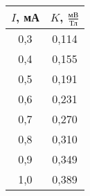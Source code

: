 \begin{tabular}{cc}
\toprule
$I$, мА & $K$, $\frac{\text{мВ}}{\text{Тл}}$ \\
\midrule
0,3 & 0,114 \\
0,4 & 0,155 \\
0,5 & 0,191 \\
0,6 & 0,231 \\
0,7 & 0,270 \\
0,8 & 0,310 \\
0,9 & 0,349 \\
1,0 & 0,389 \\
\bottomrule
\end{tabular}
